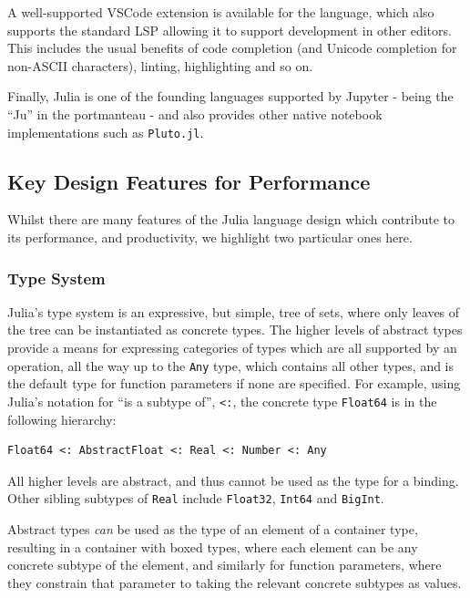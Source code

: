 \documentclass{webofc}
\begin{document}
A well-supported VSCode extension is available for the language, which also
supports the standard LSP allowing it to support development in other editors.
This includes the usual benefits of code completion (and Unicode completion for
non-ASCII characters), linting, highlighting and so on.

Finally, Julia is one of the founding languages supported by Jupyter - being the
``Ju'' in the portmanteau - and also provides other native notebook
implementations such as \texttt{Pluto.jl}. 

\subsection{Key Design Features for Performance}

Whilst there are many features of the Julia language design which contribute to its 
performance, and productivity, we highlight two particular ones here.

\subsubsection{Type System}

Julia's type system is an expressive, but simple, tree of sets, where only leaves
of the tree can be instantiated as concrete types. The higher levels of abstract
types provide a means for expressing categories of types which are all supported
by an operation, all the way up to the \verb$Any$ type, which contains all other
types, and is the default type for function parameters if none are specified.
For example, using Julia's notation for ``is a subtype of'', \texttt{<:}, the concrete type
\verb$Float64$ is in the following hierarchy:

\begin{verbatim}
Float64 <: AbstractFloat <: Real <: Number <: Any
\end{verbatim}

All higher levels are abstract, and thus cannot be used as the type for a
binding. Other sibling subtypes of \verb$Real$ include \verb$Float32$,
\verb$Int64$ and \verb$BigInt$.

Abstract types \textit{can} be used as the type of an element of a container
type, resulting in a container with boxed types, where each element can be any
concrete subtype of the element, and similarly for function parameters, where
they constrain that parameter to taking the relevant concrete subtypes as
values. 
\end{document}
